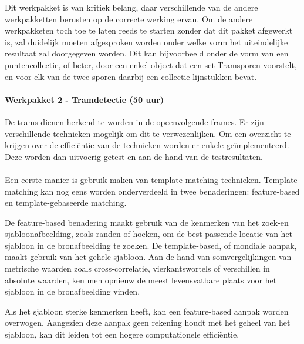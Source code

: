 \documentclass[a4paper,oneside,11pt,final]{memoir}
\begin{document}
Dit werkpakket is van kritiek belang, daar verschillende van de andere werkpakketten berusten op de correcte werking ervan. Om de andere werkpakketen toch toe te laten reeds te starten zonder dat dit pakket afgewerkt is, zal duidelijk moeten afgesproken worden onder welke vorm het uiteindelijke resultaat zal doorgegeven worden. Dit kan bijvoorbeeld onder de vorm van een puntencollectie, of beter, door een enkel object dat een set Tramsporen voorstelt, en voor elk van de twee sporen daarbij een collectie lijnstukken bevat.

\paragraph{Werkpakket 2 - Tramdetectie (50 uur)}
De trams dienen herkend te worden in de opeenvolgende frames. Er zijn verschillende technieken mogelijk om dit te verwezenlijken. Om een overzicht te krijgen over de efficiëntie van de technieken worden er enkele geïmplementeerd. Deze worden dan uitvoerig getest en aan de hand van de testresultaten.
\\\\
Een eerste manier is gebruik maken van template matching technieken.
Template matching kan nog eens worden onderverdeeld in twee benaderingen: feature-based en template-gebaseerde matching. 

De feature-based benadering maakt gebruik van de kenmerken van het zoek-en sjabloonafbeelding, zoals randen of hoeken, om de best passende locatie van het sjabloon in de bronafbeelding te zoeken.
De template-based, of mondiale aanpak, maakt gebruik van het gehele sjabloon.
Aan de hand van somvergelijkingen van metrische waarden zoals cross-correlatie, vierkantswortels of 
verschillen in absolute waarden, ken men opnieuw de meest levensvatbare plaats voor het sjabloon in de bronafbeelding vinden.
 
Als het sjabloon sterke kenmerken heeft, kan een feature-based aanpak worden overwogen. Aangezien deze aanpak geen rekening houdt met het geheel van het sjabloon, kan dit leiden tot een hogere computationele efficiëntie.
\end{document}

